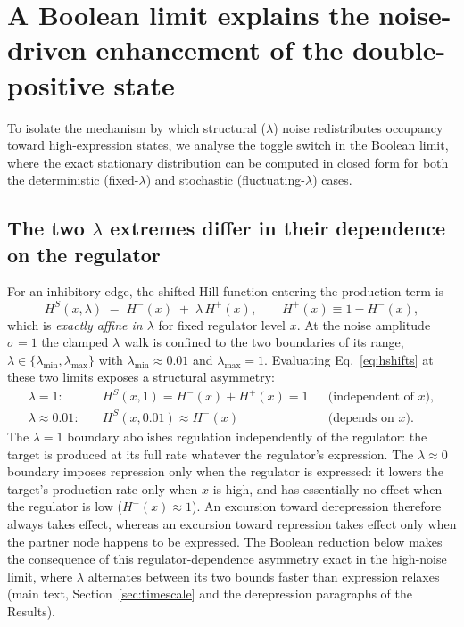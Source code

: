 \section{A Boolean limit explains the noise-driven enhancement of the double-positive state}
\label{sec:boolean}
 
To isolate the mechanism by which structural ($\lambda$) noise redistributes
occupancy toward high-expression states, we analyse the toggle switch in the
Boolean limit, where the exact stationary distribution can be computed in closed
form for both the deterministic (fixed-$\lambda$) and stochastic (fluctuating-$\lambda$)
cases.
 
\subsection{The two $\lambda$ extremes differ in their dependence on the regulator}
\label{sec:asymmetry}
 
For an inhibitory edge, the shifted Hill function entering the production term is
\begin{equation}
  H^{S}(x,\lambda) \;=\; H^{-}(x) \;+\; \lambda\,H^{+}(x),
  \qquad H^{+}(x) \equiv 1 - H^{-}(x),
  \label{eq:hshifts}
\end{equation}
which is \emph{exactly affine in $\lambda$} for fixed regulator level $x$. At the
noise amplitude $\sigma=1$ the clamped $\lambda$ walk is confined to the two
boundaries of its range, $\lambda\in\{\lambda_{\min},\lambda_{\max}\}$ with
$\lambda_{\min}\approx 0.01$ and $\lambda_{\max}=1$. Evaluating
Eq.~\eqref{eq:hshifts} at these two limits exposes a structural asymmetry:
\begin{align}
  \lambda = 1: \quad & H^{S}(x,1) = H^{-}(x)+H^{+}(x) = 1
    && \text{(independent of } x\text{)},\\
  \lambda \approx 0.01: \quad & H^{S}(x,0.01) \approx H^{-}(x)
    && \text{(depends on } x\text{)}.
\end{align}
The $\lambda=1$ boundary abolishes regulation independently of the regulator:
the target is produced at its full rate whatever the regulator's expression. The
$\lambda\approx 0$ boundary imposes repression only when the regulator is
expressed: it lowers the target's production rate only when $x$ is high, and has
essentially no effect when the regulator is low ($H^{-}(x)\!\approx\!1$).
An excursion toward derepression therefore always takes effect, whereas an
excursion toward repression takes effect only when the partner node happens to be
expressed. The Boolean reduction below makes the consequence of this
regulator-dependence asymmetry exact in the high-noise limit, where $\lambda$
alternates between its two bounds faster than expression relaxes (main text,
Section~\ref{sec:timescale} and the derepression paragraphs of the Results).
 
